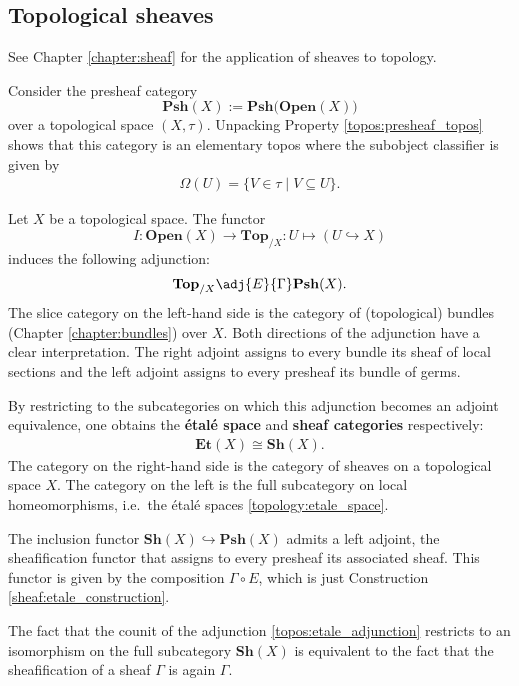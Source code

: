 \subsection{Topological sheaves}

    See Chapter \ref{chapter:sheaf} for the application of sheaves to topology.

    \begin{property}\label{topos:sheaf_topos}
        Consider the presheaf category \[\mathbf{Psh}(X):=\mathbf{Psh(Open}(X))\] over a topological space $(X,\tau)$. Unpacking Property \ref{topos:presheaf_topos} shows that this category is an elementary topos where the subobject classifier is given by
        \begin{gather}
            \Omega(U) = \{V\in\tau\mid V\subseteq U\}.
        \end{gather}
    \end{property}

    \begin{construct}\label{topos:etale_adjunction}
        Let $X$ be a topological space. The functor \[I:\mathbf{Open}(X)\rightarrow\mathbf{Top}_{/X}:U\mapsto(U\hookrightarrow X)\] induces the following adjunction:
        \begin{gather}
            \mathbf{Top}_{/X}\adj{E}{\Gamma}\mathbf{Psh}(X).
        \end{gather}
        The slice category on the left-hand side is the category of (topological) bundles (Chapter \ref{chapter:bundles}) over $X$. Both directions of the adjunction have a clear interpretation. The right adjoint assigns to every bundle its sheaf of local sections and the left adjoint assigns to every presheaf its bundle of germs.

        By restricting to the subcategories on which this adjunction becomes an adjoint equivalence, one obtains     the \textbf{\'etal\'e space} and \textbf{sheaf categories} respectively:
        \begin{gather}
            \mathbf{Et}(X)\cong\mathbf{Sh}(X).
        \end{gather}
        The category on the right-hand side is the category of sheaves on a topological space $X$. The category on the left is the full subcategory on local homeomorphisms, i.e.~the \'etal\'e spaces \ref{topology:etale_space}.
    \end{construct}

    \begin{property}
        The inclusion functor $\mathbf{Sh}(X)\hookrightarrow\mathbf{Psh}(X)$ admits a left adjoint, the sheafification functor that assigns to every presheaf its associated sheaf. This functor is given by the composition $\Gamma\circ E$, which is just Construction \ref{sheaf:etale_construction}.

        The fact that the counit of the adjunction \ref{topos:etale_adjunction} restricts to an isomorphism on the full subcategory $\mathbf{Sh}(X)$ is equivalent to the fact that the sheafification of a sheaf $\Gamma$ is again $\Gamma$.
    \end{property}

